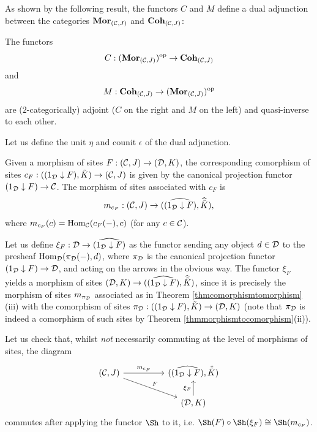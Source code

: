 \documentclass[a4paper,12pt]{article}
\begin{document}
As shown by the following result, the functors $C$ and $M$ define a dual adjunction between the categories ${\textup{\bf Mor}}_{({\cal C}, J)}$ and ${\textup{\bf Coh}}_{({\cal C}, J)}$: 

\begin{theorem}\label{adjointequivalencemorphismscomorphisms}
	The functors 
	\[
	C:	({\textup{\bf Mor}}_{({\cal C}, J)})^{\textup{op}} \to 	{\textup{\bf Coh}}_{({\cal C}, J)}
	\] 
	and
	\[
	M:	{\textup{\bf Coh}}_{({\cal C}, J)} \to 	({\textup{\bf Mor}}_{({\cal C}, J)})^{\textup{op}} 
	\]  
	are ($2$-categorically) adjoint ($C$ on the right and $M$ on the left) and quasi-inverse to each other.
\end{theorem}	

\begin{proofs}
	Let us define the unit $\eta$ and counit $\epsilon$ of the dual adjunction.
	
	Given a morphism of sites $F:({\cal C}, J)\to ({\cal D}, K)$, the corresponding comorphism of sites $c_{F}:((1_{\cal D}\downarrow F), \tilde{K})\to ({\cal C}, J)$ is given by the canonical projection functor $(1_{\cal D}\downarrow F)\to {\cal C}$. The morphism of sites associated with $c_{F}$ is 
	\[
	m_{c_{F}}:({\cal C}, J)\to (\widehat{(1_{\cal D}\downarrow F)}, \widehat{\tilde{K}}), 
	\] 
	where $m_{c_{F}}(c)=\textup{Hom}_{\cal C}(c_{F}(-), c)$ (for any $c\in {\cal C}$).
	
	Let us define $\xi_{F}:{\cal D}\to \widehat{(1_{\cal D}\downarrow F)}$ as the functor sending any object $d\in {\cal D}$ to the presheaf $\textup{Hom}_{\cal D}(\pi_{\cal D}(-), d)$, where $\pi_{\cal D}$ is the canonical projection functor $(1_{\cal D}\downarrow F)\to {\cal D}$, and acting on the arrows in the obvious way. The functor $\xi_{F}$ yields a morphism of sites $({\cal D}, K)\to (\widehat{(1_{\cal D}\downarrow F)}, \widehat{\tilde{K}})$, since it is precisely the morphism of sites $m_{\pi_{\cal D}}$ associated as in Theorem \ref{thmcomorphismtomorphism}(iii) with the comorphism of sites $\pi_{\cal D}:((1_{\cal D}\downarrow F), \tilde{K})\to ({\cal D}, K)$ (note that $\pi_{\cal D}$ is indeed a comorphism of such sites by Theorem \ref{thmmorphismtocomorphism}(ii)). 
	
	Let us check that, whilst \emph{not} necessarily commuting at the level of morphisms of sites, the diagram 
	\begin{equation*}
	\begin{tikzcd}
	({\cal C}, J) \arrow[rr, "m_{c_{F}}"]   \arrow[drr, "F"]   & &  (\widehat{(1_{\cal D}\downarrow F)}, \hat{\tilde{K}})           \\
	&  & ({\cal D}, K) \ar[u, "\xi_{F}"] 
	\end{tikzcd}
	\end{equation*}	
	{\flushleft
	commutes after applying the functor $\Sh$ to it, i.e. $\Sh(F)\circ \Sh(\xi_{F})\cong \Sh(m_{c_{F}})$.}
	

\end{proofs}
\end{document}
